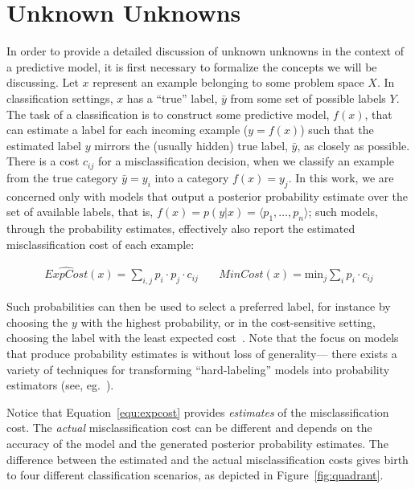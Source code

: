 \section{Unknown Unknowns}
\label{sec:unknowns}

In order to provide a detailed discussion of unknown unknowns in the context of a predictive model, it is first necessary to formalize the concepts we will be discussing. Let $x$ represent an example belonging to some problem space $X$. In classification settings, $x$ has a ``true'' label, $\bar{y}$ from some set of possible labels $Y$. The task of a classification is to construct some predictive model, $f(x)$, that can estimate a label for each incoming example ($y = f(x)$) such that the estimated label $y$ mirrors the (usually hidden) true label, $\bar{y}$, as closely as possible. There is a cost $c_{ij}$ for a misclassification decision, when we classify an example from the true category $\bar{y}=y_i$ into a category $f(x)=y_j$. In this work, we are concerned only with models that output a posterior probability estimate over the set of available labels, that is, $f(x) = p(y | x) = \langle p_1, \ldots, p_n \rangle$; such models, through the probability estimates, effectively also  report the estimated misclassification cost of each example:

\begin{eqnarray}
\widehat{\mathit{ExpCost}}(x) =  \sum_{i,j} p_i \cdot p_j \cdot c_{ij} & ~ & \widehat{\mathit{MinCost}}(x) =  \mbox{min}_j \sum_{i} p_i \cdot c_{ij} \label{equ:expcost} 
 \label{equ:mincost}
\end{eqnarray}

Such probabilities can then be used to select a preferred label, for instance by choosing the $y$ with the highest probability, or in the cost-sensitive setting, choosing the label with the least expected cost~\cite{elkan:2001cost}. Note that the focus on models that produce probability estimates is without loss of generality--- there exists a variety of techniques for transforming ``hard-labeling'' models into probability estimators (see, eg.~\cite{domingos1999metacost}).

Notice that Equation~\ref{equ:expcost} provides \emph{estimates} of the misclassification cost. The \emph{actual} misclassification cost can be different and depends on the accuracy of the model and the generated posterior probability estimates. The difference between the estimated and the 
actual misclassification costs gives birth to four different classification scenarios, as depicted in Figure~\ref{fig:quadrant}.


